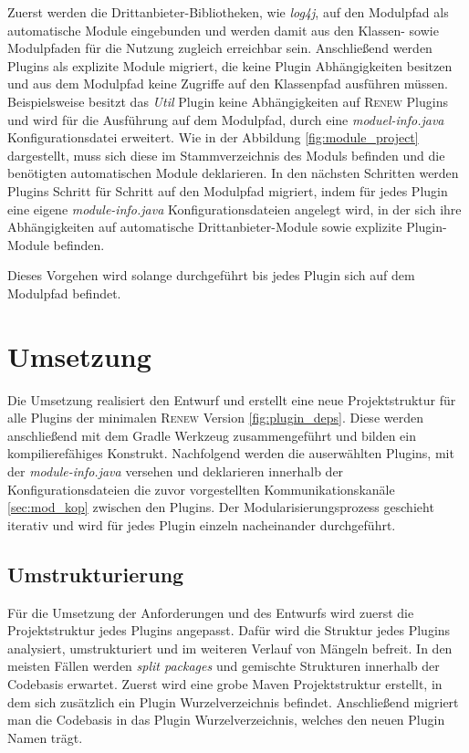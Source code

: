 	Zuerst werden die Drittanbieter-Bibliotheken, wie \textit{log4j}, auf den Modulpfad als automatische Module eingebunden und werden damit aus den Klassen- sowie Modulpfaden für die Nutzung zugleich erreichbar sein. Anschließend werden Plugins als explizite Module migriert, die keine Plugin Abhängigkeiten besitzen und aus dem Modulpfad keine Zugriffe auf den Klassenpfad ausführen müssen.   Beispielsweise besitzt das \textit{Util} Plugin keine Abhängigkeiten auf \textsc{Renew} Plugins und wird für die Ausführung auf dem Modulpfad, durch eine \textit{moduel-info.java} Konfigurationsdatei erweitert. Wie in der Abbildung \ref{fig:module_project} dargestellt, muss sich diese im Stammverzeichnis des Moduls befinden und die benötigten automatischen Module deklarieren.\newline
	In den nächsten Schritten werden Plugins Schritt für Schritt auf den Modulpfad migriert, indem für jedes Plugin eine eigene \textit{module-info.java} Konfigurationsdateien angelegt wird, in der sich ihre Abhängigkeiten auf automatische Drittanbieter-Module sowie explizite Plugin-Module befinden.\bigbreak 

	Dieses Vorgehen wird solange durchgeführt bis jedes Plugin sich auf dem Modulpfad befindet. 

\section{Umsetzung}

	Die Umsetzung realisiert den Entwurf und erstellt eine neue Projektstruktur für alle Plugins der minimalen \textsc{Renew} Version \ref{fig:plugin_deps}. Diese werden anschließend mit dem Gradle Werkzeug zusammengeführt und bilden ein kompilierefähiges Konstrukt. Nachfolgend werden die auserwählten Plugins, mit der \textit{module-info.java} versehen und deklarieren innerhalb der Konfigurationsdateien die zuvor vorgestellten Kommunikationskanäle \ref{sec:mod_kop} zwischen den Plugins.\newline
	Der Modularisierungsprozess geschieht iterativ und wird für jedes Plugin einzeln nacheinander durchgeführt.
\newpage
\subsection{Umstrukturierung}

	Für die Umsetzung der Anforderungen und des Entwurfs wird zuerst die Projektstruktur jedes Plugins angepasst. Dafür wird die Struktur jedes Plugins analysiert, umstrukturiert und im weiteren Verlauf von Mängeln befreit. In den meisten Fällen werden \textit{split packages} und gemischte Strukturen innerhalb der Codebasis erwartet.\bigbreak
	Zuerst wird eine grobe Maven Projektstruktur erstellt, in dem sich zusätzlich ein Plugin Wurzelverzeichnis befindet. Anschließend migriert man die Codebasis in das Plugin Wurzelverzeichnis, welches den neuen Plugin Namen trägt.

